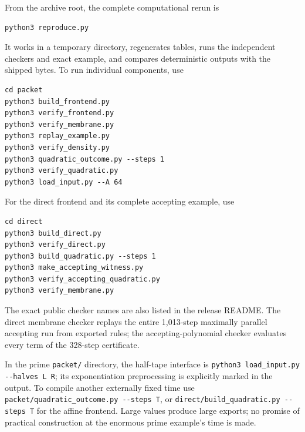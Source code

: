 \documentclass[11pt,letterpaper]{article}
\theoremstyle{definition}
\theoremstyle{remark}
\newcommand{\file}[1]{\nolinkurl{#1}}
\begin{document}
From the archive root, the complete computational rerun is
\begin{lstlisting}
python3 reproduce.py
\end{lstlisting}
It works in a temporary directory, regenerates tables, runs the independent checkers and exact example, and compares deterministic outputs with the shipped bytes. To run individual components, use
\begin{lstlisting}
cd packet
python3 build_frontend.py
python3 verify_frontend.py
python3 verify_membrane.py
python3 replay_example.py
python3 verify_density.py
python3 quadratic_outcome.py --steps 1
python3 verify_quadratic.py
python3 load_input.py --A 64
\end{lstlisting}
For the direct frontend and its complete accepting example, use
\begin{lstlisting}
cd direct
python3 build_direct.py
python3 verify_direct.py
python3 build_quadratic.py --steps 1
python3 make_accepting_witness.py
python3 verify_accepting_quadratic.py
python3 verify_membrane.py
\end{lstlisting}
The exact public checker names are also listed in the release README. The direct membrane checker replays the entire 1,013-step maximally parallel accepting run from exported rules; the accepting-polynomial checker evaluates every term of the 328-step certificate.

In the prime \file{packet/} directory, the half-tape interface is \lstinline|python3 load_input.py --halves L R|; its exponentiation preprocessing is explicitly marked in the output. To compile another externally fixed time use \lstinline|packet/quadratic_outcome.py --steps T|, or \lstinline|direct/build_quadratic.py --steps T| for the affine frontend. Large values produce large exports; no promise of practical construction at the enormous prime example's time is made.
\end{document}
